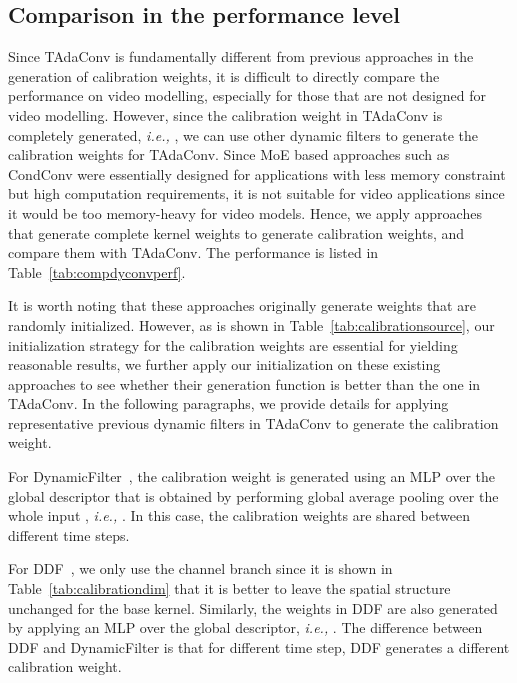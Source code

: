 \documentclass{article} \usepackage{iclr2022_conference,times}
\begin{document}
\subsection{Comparison in the performance level}
Since TAdaConv is fundamentally different from previous approaches in the generation of calibration weights, it is difficult to directly compare the performance on video modelling, especially for those that are not designed for video modelling. 
However, since the calibration weight in TAdaConv  is completely generated, \textit{i.e.,} , we can use other dynamic filters to generate the calibration weights for TAdaConv. 
Since MoE based approaches such as CondConv were essentially designed for applications with less memory constraint but high computation requirements, it is not suitable for video applications since it would be too memory-heavy for video models. 
Hence, we apply approaches that generate complete kernel weights to generate calibration weights, and compare them with TAdaConv. 
The performance is listed in Table~\ref{tab:compdyconvperf}.

It is worth noting that these approaches originally generate weights that are randomly initialized. 
However, as is shown in Table~\ref{tab:calibrationsource}, our initialization strategy for the calibration weights are essential for yielding reasonable results, we further apply our initialization on these existing approaches to see whether their generation function is better than the one in TAdaConv.
In the following paragraphs, we provide details for applying representative previous dynamic filters in TAdaConv to generate the calibration weight.

For DynamicFilter~\citep{dynamicfilter}, the calibration weight  is generated using an MLP over the global descriptor that is obtained by performing global average pooling over the whole input , \textit{i.e.,} .
In this case, the calibration weights are shared between different time steps. 

For DDF~\citep{ddf}, we only use the channel branch since it is shown in Table~\ref{tab:calibrationdim} that it is better to leave the spatial structure unchanged for the base kernel.
Similarly, the weights in DDF are also generated by applying an MLP over the global descriptor, \textit{i.e.,} .
The difference between DDF and DynamicFilter is that for different time step, DDF generates a different calibration weight.
\end{document}
